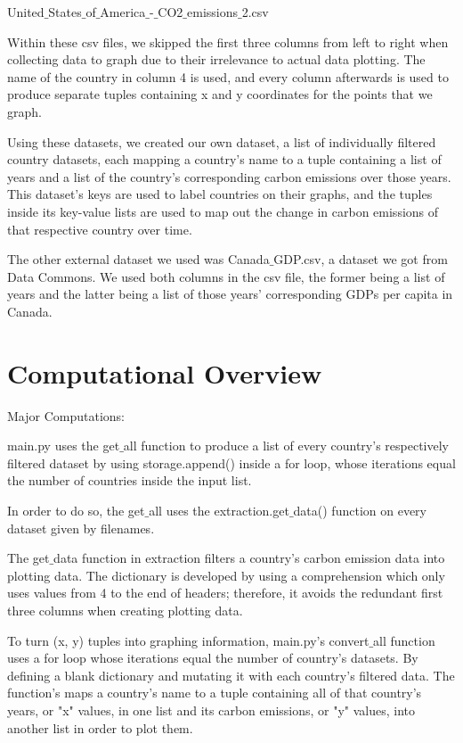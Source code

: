 \documentclass[fontsize=11pt]{article}
\begin{document}
    United$\_$States$\_$of$\_$America$\_$-$\_$CO2$\_$emissions$\_$2.csv

    Within these csv files, we skipped the first three columns from left to right when collecting data to graph due to their irrelevance to actual data plotting. The name of the country in column 4 is used, and every column afterwards is used to produce separate tuples containing x and y coordinates for the points that we graph.

    Using these datasets, we created our own dataset, a list of individually filtered country datasets, each mapping a country’s name to a tuple containing a list of years and a list of the country’s corresponding carbon emissions over those years. This dataset’s keys are used to label countries on their graphs, and the tuples inside its key-value lists are used to map out the change in carbon emissions of that respective country over time.

    The other external dataset we used was Canada$\_$GDP.csv, a dataset we got from Data Commons. We used both columns in the csv file, the former being a list of years and the latter being a list of those years' corresponding GDPs per capita in Canada.

    \section*{Computational Overview}
    Major Computations:

    main.py uses the get$\_$all function to produce a list of every country's respectively filtered dataset by using storage.append() inside a for loop, whose iterations equal the number of countries inside the input list.

    In order to do so, the get$\_$all uses the extraction.get$\_$data() function on every dataset given by filenames.

    The get$\_$data function in extraction filters a country's carbon emission data into plotting data. The dictionary is developed by using a comprehension which only uses values from 4 to the end of headers; therefore, it avoids the redundant first three columns when creating plotting data.

    To turn (x, y) tuples into graphing information, main.py's convert$\_$all function uses a for loop whose iterations equal the number of country's datasets. By defining a blank dictionary and mutating it with each country's filtered data. The function's maps a country's name to a tuple containing all of that country's years, or "x" values, in one list and its carbon emissions, or "y" values, into another list in order to plot them.
\end{document}
